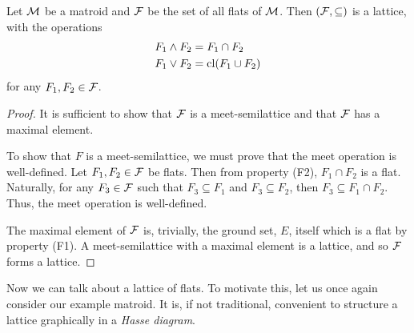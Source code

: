 \documentclass[12pt,oneside]{../../sfsuthesis}
\begin{document}
\begin{proposition}\th\label{thm:flatLattice}
    Let \( \mathcal{M} \) be a matroid and \( \mathcal{F} \) be the set of all flats of \( \mathcal{M} \).
    Then \( ( \mathcal{F}, \subseteq) \) is a lattice, with the operations
    \begin{align*}
        F_1 \wedge F_2 & = F_1 \cap F_2      \\
        F_1 \vee F_2   & = \operatorname{cl}(F_1 \cup F_2)
    \end{align*}
    for any \( F_1, F_2 \in \mathcal{F} \).
\end{proposition}
\begin{proof}
    It is sufficient to show that \( \mathcal{F} \) is a meet-semilattice and that \( \mathcal{F} \) has a maximal element.

    To show that \( F \) is a meet-semilattice, we must prove that the meet operation is well-defined.
    Let \( F_1, F_2 \in \mathcal{F} \) be flats.
    Then from property (F2), \( F_1 \cap F_2 \) is a flat.
    Naturally, for any \( F_3 \in \mathcal{F} \) such that  \( F_3 \subseteq  F_1 \) and \( F_3 \subseteq F_2 \), then \( F_3 \subseteq F_1 \cap F_2 \).
    Thus, the meet operation is well-defined.

    The maximal element of \( \mathcal{F} \) is, trivially, the ground set, \( E \), itself which is a flat by property (F1).
    A meet-semilattice with a maximal element is a lattice, and so \( \mathcal{F} \) forms a lattice.
\end{proof}

Now we can talk about a lattice of flats.
To motivate this, let us once again consider our example matroid.
It is, if not traditional, convenient to structure a lattice graphically in a \emph{Hasse diagram}.
\end{document}

